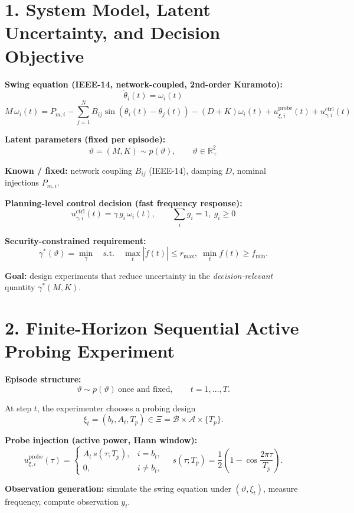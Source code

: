 \section*{1. System Model, Latent Uncertainty, and Decision Objective}

\textbf{Swing equation (IEEE-14, network-coupled, 2nd-order Kuramoto):}
\[
\dot{\theta}_i(t)=\omega_i(t)
\]
\[
M\,\dot{\omega}_i(t)=
P_{m,i}
-\sum_{j=1}^{N}B_{ij}\sin(\theta_i(t)-\theta_j(t))
-(D+K)\omega_i(t)
+u^{\text{probe}}_{\xi,i}(t)
+u^{\text{ctrl}}_{\gamma,i}(t)
\]

\textbf{Latent parameters (fixed per episode):}
\[
\vartheta=(M,K)\sim p(\vartheta), \qquad \vartheta\in\mathbb{R}_+^2
\]

\textbf{Known / fixed:}
network coupling $B_{ij}$ (IEEE-14), damping $D$, nominal injections $P_{m,i}$.

\vspace{0.4em}
\textbf{Planning-level control decision (fast frequency response):}
\[
u^{\text{ctrl}}_{\gamma,i}(t)=\gamma\,g_i\,\omega_i(t),
\qquad \sum_i g_i=1,\ g_i\ge0
\]

\textbf{Security-constrained requirement:}
\[
\gamma^*(\vartheta)=
\min_{\gamma}
\quad \text{s.t.}\quad
\max_t|\dot f(t)|\le r_{\max},\;
\min_t f(t)\ge f_{\min}.
\]

\textbf{Goal:}
design experiments that reduce uncertainty in the \emph{decision-relevant}
quantity $\gamma^*(M,K)$.

\newpage
\section*{2. Finite-Horizon Sequential Active Probing Experiment}

\textbf{Episode structure:}
\[
\vartheta\sim p(\vartheta)\ \text{once and fixed},\qquad t=1,\dots,T.
\]

At step $t$, the experimenter chooses a probing design
\[
\xi_t=(b_t,A_t,T_p)\in\Xi=\mathcal{B}\times\mathcal{A}\times\{T_p\}.
\]

\textbf{Probe injection (active power, Hann window):}
\[
u^{\text{probe}}_{\xi,i}(\tau)=
\begin{cases}
A_t\,s(\tau;T_p), & i=b_t,\\
0, & i\neq b_t,
\end{cases}
\quad
s(\tau;T_p)=\frac12\!\left(1-\cos\frac{2\pi\tau}{T_p}\right).
\]

\textbf{Observation generation:}
simulate the swing equation under $(\vartheta,\xi_t)$, measure frequency,
compute observation $y_t$.

